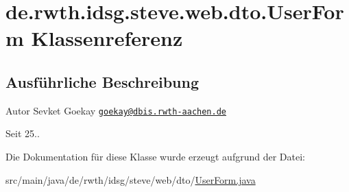 \hypertarget{classde_1_1rwth_1_1idsg_1_1steve_1_1web_1_1dto_1_1_user_form}{\section{de.\-rwth.\-idsg.\-steve.\-web.\-dto.\-User\-Form Klassenreferenz}
\label{classde_1_1rwth_1_1idsg_1_1steve_1_1web_1_1dto_1_1_user_form}
}


\subsection{Ausführliche Beschreibung}
\begin{DoxyAuthor}{Autor}
Sevket Goekay \href{mailto:goekay@dbis.rwth-aachen.de}{\tt goekay@dbis.\-rwth-\/aachen.\-de} 
\end{DoxyAuthor}
\begin{DoxySince}{Seit}
25.. 
\end{DoxySince}


Die Dokumentation für diese Klasse wurde erzeugt aufgrund der Datei\-:\begin{DoxyCompactItemize}
\item 
src/main/java/de/rwth/idsg/steve/web/dto/\hyperlink{_user_form_8java}{User\-Form.\-java}\end{DoxyCompactItemize}
